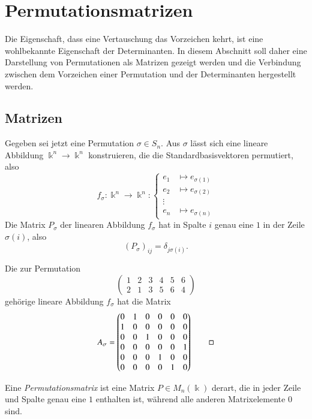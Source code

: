 %
%
%
\section{Permutationsmatrizen
\label{buch:section:permutationsmatrizen}}
Die Eigenschaft, dass eine Vertauschung das Vorzeichen kehrt, ist
eine wohlbekannte Eigenschaft der Determinanten.
In diesem Abschnitt soll daher eine Darstellung von Permutationen
als Matrizen gezeigt werden und die Verbindung zwischen dem
Vorzeichen einer Permutation und der Determinanten hergestellt
werden.
%

\subsection{Matrizen}
Gegeben sei jetzt eine Permutation $\sigma\in S_n$. 
Aus $\sigma$ lässt sich eine lineare Abbildung $\Bbbk^n\to\Bbbk^n$
konstruieren, die die Standardbasisvektoren permutiert, also
\[
f_{\sigma}\colon
\Bbbk^n \to \Bbbk^n
:
\left\{
\begin{aligned}
e_1&\mapsto e_{\sigma(1)} \\
e_2&\mapsto e_{\sigma(2)} \\
\vdots&\\
e_n&\mapsto e_{\sigma(n)}
\end{aligned}
\right.
\]
Die Matrix $P_\sigma$ der linearen Abbildung $f_{\sigma}$ hat in Spalte $i$
genau eine $1$ in der Zeile $\sigma(i)$, also
\[
(P_\sigma)_{i\!j} = \delta_{j\sigma(i)}.
\]

\begin{beispiel}
Die zur Permutation
\[
\begin{pmatrix}
1&2&3&4&5&6\\
2&1&3&5&6&4
\end{pmatrix}
\]
gehörige lineare Abbildung $f_\sigma$ hat die Matrix
\[
A_\sigma
=
\begin{pmatrix}
0&1&0&0&0&0\\
1&0&0&0&0&0\\
0&0&1&0&0&0\\
0&0&0&0&0&1\\
0&0&0&1&0&0\\
0&0&0&0&1&0
\end{pmatrix}
\qedhere
\]
\end{beispiel}

\begin{definition}
\label{buch:permutationen:def:permutationsmatrix}
%
Eine {\em Permutationsmatrix} ist eine Matrix $P\in M_n(\Bbbk)$ 
derart, die in jeder Zeile und Spalte genau eine $1$ enthalten ist,
während alle anderen Matrixelemente $0$ sind.
\end{definition}

